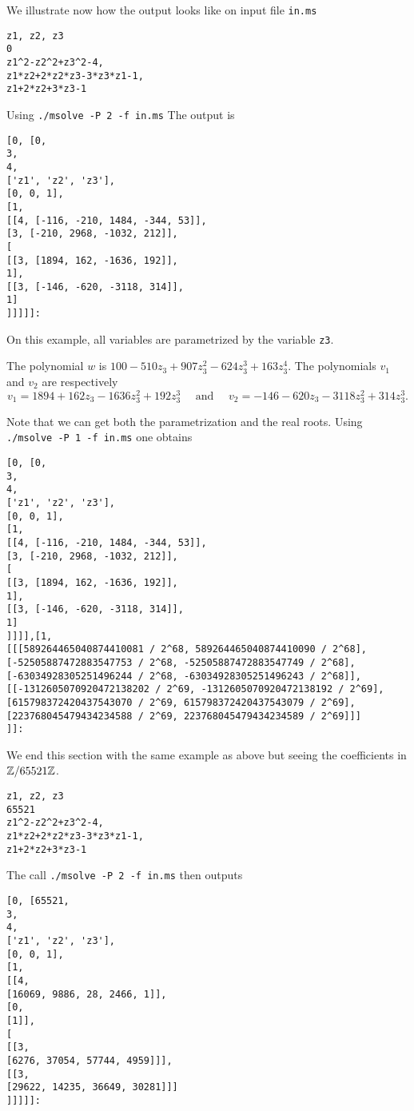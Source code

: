 \documentclass[a4paper,english,11pt]{scrartcl}
\theoremstyle{definition}
\theoremstyle{remark}
\begin{document}
We illustrate now how the output looks like on input file \verb+in.ms+
\begin{tcolorbox}
\begin{verbatim}
z1, z2, z3
0
z1^2-z2^2+z3^2-4,
z1*z2+2*z2*z3-3*z3*z1-1,
z1+2*z2+3*z3-1
\end{verbatim}
\end{tcolorbox}
Using \verb+./msolve -P 2 -f in.ms+ The output is 
\begin{tcolorbox}
\begin{verbatim}
[0, [0, 
3, 
4, 
['z1', 'z2', 'z3'],
[0, 0, 1],
[1,
[[4, [-116, -210, 1484, -344, 53]],
[3, [-210, 2968, -1032, 212]],
[
[[3, [1894, 162, -1636, 192]],
1],
[[3, [-146, -620, -3118, 314]],
1]
]]]]]:
\end{verbatim}
\end{tcolorbox}
On this example, all variables are parametrized by the variable \verb+z3+. 

The polynomial $w$ is $100-510z_3 + 907z_3^2 -624z_3^3+ 163z_3^4$. 
The polynomials $v_1$ and $v_2$ are respectively 
\[
    v_1 = 1894 + 162 z_3 -1636 z_3^2+ 192 z_3^3 \quad \text{ and } 
    \quad v_2 = -146 -620 z_3 -3118 z_3^2+ 314 z_3^3.
\]

Note that we can get both the parametrization and the real roots. Using 
\verb+./msolve -P 1 -f in.ms+ one obtains

\begin{verbatim}
[0, [0, 
3, 
4, 
['z1', 'z2', 'z3'],
[0, 0, 1],
[1,
[[4, [-116, -210, 1484, -344, 53]],
[3, [-210, 2968, -1032, 212]],
[
[[3, [1894, 162, -1636, 192]],
1],
[[3, [-146, -620, -3118, 314]],
1]
]]]],[1,
[[[589264465040874410081 / 2^68, 589264465040874410090 / 2^68], [-52505887472883547753 / 2^68, -52505887472883547749 / 2^68], [-63034928305251496244 / 2^68, -63034928305251496243 / 2^68]], [[-1312605070920472138202 / 2^69, -1312605070920472138192 / 2^69], [615798372420437543070 / 2^69, 615798372420437543079 / 2^69], [223768045479434234588 / 2^69, 223768045479434234589 / 2^69]]]
]]:
\end{verbatim}

We end this section with the same example as above but seeing the coefficients in 
\(\mathbb{Z}/65521\mathbb{Z}\).
\begin{verbatim}
z1, z2, z3
65521
z1^2-z2^2+z3^2-4,
z1*z2+2*z2*z3-3*z3*z1-1,
z1+2*z2+3*z3-1
\end{verbatim}
The call \verb+./msolve -P 2 -f in.ms+ then outputs
\begin{verbatim}
[0, [65521, 
3, 
4, 
['z1', 'z2', 'z3'],
[0, 0, 1],
[1,
[[4,
[16069, 9886, 28, 2466, 1]],
[0,
[1]],
[
[[3,
[6276, 37054, 57744, 4959]]],
[[3,
[29622, 14235, 36649, 30281]]]
]]]]]:
\end{verbatim}
\end{document}
